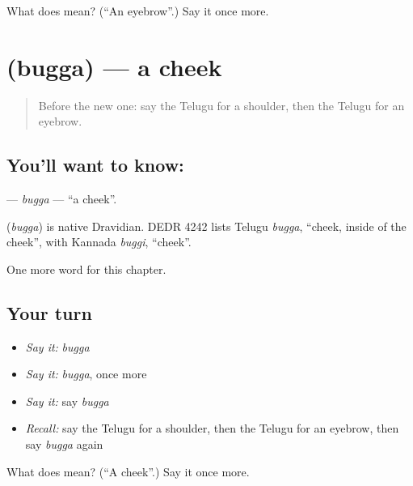 \begin{tcolorbox}[breakable,colback=teal!4,colframe=teal!35!black,title={Before you move on}]
What does  mean? (\textquotedblleft{}An eyebrow\textquotedblright{}.) Say it once more.
\end{tcolorbox}
\section[\texorpdfstring{\te{బుగ్గ} (bugga)}{బుగ్గ (bugga)}]{ (bugga) — a cheek}

\label{lesson:TE-C127-bugga}



\begin{quote}
Before the new one: say the Telugu for a shoulder, then the Telugu for an eyebrow.
\end{quote}

\subsection*{You'll want to know: }
\textbf{} — \emph{bugga} — \textquotedblleft{}a cheek\textquotedblright{}.

\begin{cousinweb}
\textbf{} (\emph{bugga}) is native Dravidian. DEDR 4242 lists Telugu \emph{bugga}, \textquotedblleft{}cheek, inside of the cheek\textquotedblright{}, with Kannada \emph{buggi}, \textquotedblleft{}cheek\textquotedblright{}.
\end{cousinweb}

\begin{grammarlens}[title={What you've built}]
One more word for this chapter.
\end{grammarlens}

\subsection*{Your turn}
\begin{itemize}
\raggedright
  \item \emph{Say it:} \emph{bugga}
  \item \emph{Say it:} \emph{bugga}, once more
  \item \emph{Say it:} say \emph{bugga}
  \item \emph{Recall:} say the Telugu for a shoulder, then the Telugu for an eyebrow, then say \emph{bugga} again
\end{itemize}

\begin{tcolorbox}[breakable,colback=teal!4,colframe=teal!35!black,title={Before you move on}]
What does  mean? (\textquotedblleft{}A cheek\textquotedblright{}.) Say it once more.
\end{tcolorbox}
